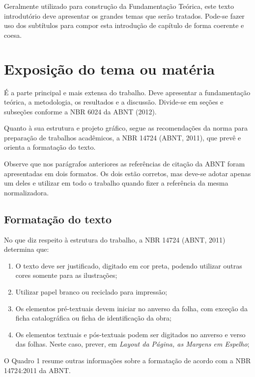 {\color{red}
Geralmente utilizado para construção da Fundamentação Teórica, este texto introdutório deve apresentar os grandes temas que serão tratados. Pode-se fazer uso dos subtítulos para compor esta introdução de capítulo de forma coerente e coesa.


\section{Exposição do tema ou matéria}

É a parte principal e mais extensa do trabalho. Deve apresentar a fundamentação teórica, a metodologia, os resultados e a discussão. Divide-se em seções e subseções conforme a NBR 6024 da ABNT (2012).

Quanto à sua estrutura e projeto gráfico, segue as recomendações da norma para preparação de trabalhos acadêmicos, a NBR 14724 (ABNT, 2011), que prevê e orienta a formatação do texto.

Observe que nos parágrafos anteriores as referências de citação da ABNT foram apresentadas em dois formatos. Os dois estão corretos, mas deve-se adotar apenas um deles e utilizar em todo o trabalho quando fizer a referência da mesma normalizadora.

\subsection{Formatação do texto}

No que diz respeito à estrutura do trabalho, a NBR 14724 (ABNT, 2011) determina que:

\begin{enumerate}[label=\alph*)]
    \item O texto deve ser justificado, digitado em cor preta, podendo utilizar outras cores somente para as ilustrações;
    \item Utilizar papel branco ou reciclado para impressão;
    \item Os elementos pré-textuais devem iniciar no anverso da folha, com exceção da ficha catalográfica ou ficha de identificação da obra;
    \item Os elementos textuais e pós-textuais podem ser digitados no anverso e verso das folhas. Neste caso, prever, em \textit{Layout da Página, as Margens em Espelho};
\end{enumerate}

O Quadro 1 resume outras informações sobre a formatação de acordo com a NBR 14724:2011 da ABNT.\newpage

}
